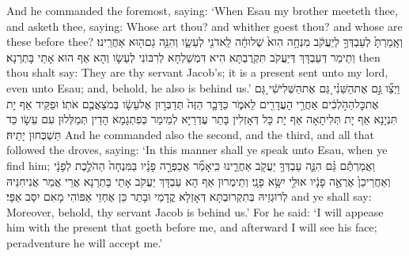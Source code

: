 {And he commanded the foremost, saying: ‘When Esau my brother meeteth thee, and asketh thee, saying: Whose art thou? and whither goest thou? and whose are these before thee?}{}
{וְאָֽמַרְתָּ֙ לְעַבְדְּךָ֣ לְיַעֲקֹ֔ב מִנְחָ֥ה הִוא֙ שְׁלוּחָ֔ה לַֽאדֹנִ֖י לְעֵשָׂ֑ו וְהִנֵּ֥ה גַם\maqqaf ה֖וּא אַחֲרֵֽינוּ׃}
{וְתֵימַר דְּעַבְדָּךְ דְּיַעֲקֹב תִּקְרֻבְתָּא הִיא דִּמְשַׁלְחָא לְרִבּוֹנִי לְעֵשָׂו וְהָא אַף הוּא אָתֵי בָּתְרַנָא׃}
{then thou shalt say: They are thy servant Jacob’s; it is a present sent unto my lord, even unto Esau; and, behold, he also is behind us.’}{}
{וַיְצַ֞ו גַּ֣ם אֶת\maqqaf הַשֵּׁנִ֗י גַּ֚ם אֶת\maqqaf הַשְּׁלִישִׁ֔י גַּ֚ם אֶת\maqqaf כׇּל\maqqaf הַהֹ֣לְכִ֔ים אַחֲרֵ֥י הָעֲדָרִ֖ים לֵאמֹ֑ר כַּדָּבָ֤ר הַזֶּה֙ תְּדַבְּר֣וּן אֶל\maqqaf עֵשָׂ֔ו בְּמֹצַאֲכֶ֖ם אֹתֽוֹ׃}
{וּפַקֵּיד אַף יָת תִּנְיָנָא אַף יָת תְּלִיתָאָה אַף יָת כָּל דְּאָזְלִין בָּתַר עֶדְרַיָּא לְמֵימַר כְּפִתְגָמָא הָדֵין תְּמַלְּלוּן עִם עֵשָׂו כַּד תַּשְׁכְּחוּן יָתֵיהּ׃}
{And he commanded also the second, and the third, and all that followed the droves, saying: ‘In this manner shall ye speak unto Esau, when ye find him;}{}
{וַאֲמַרְתֶּ֕ם גַּ֗ם הִנֵּ֛ה עַבְדְּךָ֥ יַעֲקֹ֖ב אַחֲרֵ֑ינוּ כִּֽי\maqqaf אָמַ֞ר אֲכַפְּרָ֣ה פָנָ֗יו בַּמִּנְחָה֙ הַהֹלֶ֣כֶת לְפָנָ֔י וְאַחֲרֵי\maqqaf כֵן֙ אֶרְאֶ֣ה פָנָ֔יו אוּלַ֖י יִשָּׂ֥א פָנָֽי׃}
{וְתֵימְרוּן אַף הָא עַבְדָּךְ יַעֲקֹב אָתֵי בָּתְרַנָא אֲרֵי אֲמַר אֲנִיחִנֵּיהּ לְרוּגְזֵיהּ בְּתִקְרוּבְתָּא דְּאָזְלָא קֳדָמַי וּבָתַר כֵּן אֶחְזֵי אַפּוֹהִי מָאִם יִסַּב אַפָּי׃}
{and ye shall say: Moreover, behold, thy servant Jacob is behind us.’ For he said: ‘I will appease him with the present that goeth before me, and afterward I will see his face; peradventure he will accept me.’}{}
